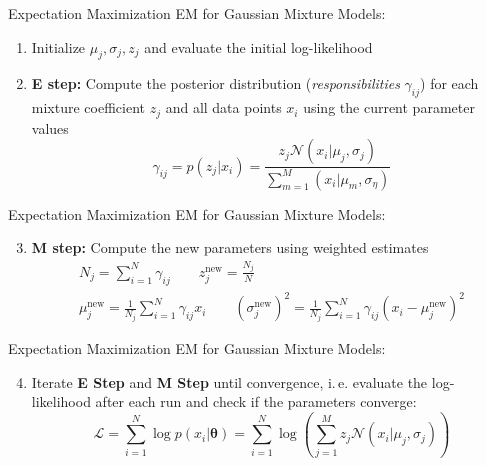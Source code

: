 \begin{frame}{Expectation Maximization}{}
EM for Gaussian Mixture Models:
	\begin{enumerate}
		\item Initialize $\mu_j, \sigma_j, z_j$ and evaluate the initial log-likelihood
		\item \textbf{E step:} Compute the posterior distribution (\textit{responsibilities} $\gamma_{ij}$) for each mixture coefficient $z_j$ and all data points $x_i$ using the current parameter values
		\begin{equation}
			\gamma_{ij} = p(z_j|x_i) = \frac{z_j \mathcal{N}(x_i|\mu_j, \sigma_j)}{\sum_{m=1}^M (x_i|\mu_m, \sigma_\eta)}
		\end{equation}
	\end{enumerate}
\end{frame}

\begin{frame}{Expectation Maximization}{}
EM for Gaussian Mixture Models:
	\begin{enumerate}
		\setcounter{enumi}{2}
		\item \textbf{M step:} Compute the new parameters using weighted estimates\\
		\begin{gather}
			N_j = \sum_{i=1}^N \gamma_{ij} \qquad z_{j}^{\text{new}} = \frac{N_j}{N}\\
			\mu_j^{\text{new}} = \frac{1}{N_j} \sum_{i=1}^N \gamma_{ij} x_i \qquad (\sigma_j^{\text{new}})^2 = \frac{1}{N_j} \sum_{i=1}^N \gamma_{ij} (x_i - \mu_j^{\text{new}})^2
		\end{gather}
	\end{enumerate}
\end{frame}

\begin{frame}{Expectation Maximization}{}
EM for Gaussian Mixture Models:
	\begin{enumerate}
		\setcounter{enumi}{3}
		\item Iterate \textbf{E Step} and \textbf{M Step} until convergence, i.\,e. evaluate the log-likelihood after each run and check if the parameters converge:
		\begin{equation}
			\mathcal{L} = \sum_{i=1}^N \log p(x_i|\bm{\theta}) = \sum_{i=1}^N \log\left(\sum_{j=1}^M z_j \mathcal{N}(x_i|\mu_j, \sigma_j)\right)
		\end{equation}
	\end{enumerate}
\end{frame}

